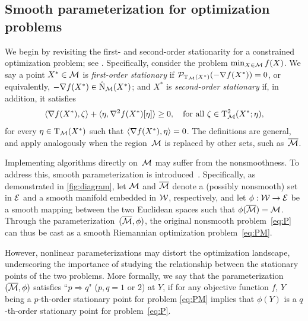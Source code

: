 \subsection{Smooth parameterization for optimization problems}\label{sec:smoothpara_opt}
We begin by revisiting the first- and second-order stationarity for a constrained optimization problem; see \cite{ruszczynski2006nonlinearopt}. Specifically, consider the problem $\min_{X\in\mathcal{M}} f(X)$. We say a point $X^*\in\mathcal{M}$ is \emph{first-order stationary} if $\mathcal{P}_{\mathrm{T}_{\mathcal{M}}(X^*)}(-\nabla f(X^*))=0$, or equivalently, $-\nabla f(X^*)\in\hat{\mathrm{N}}_{\mathcal{M}}(X^*)$; and $X^*$ is \emph{second-order stationary} if, in addition, it satisfies
\begin{equation}\label{eq:def2optcon}
    \langle {\nabla f(X^*),\zeta} \rangle+\langle {\eta,\nabla^2 f(X^*)[\eta]} \rangle \ge 0,\quad\text{for all}\ \zeta\in\mathrm{T}^2_{\mathcal{M}}(X^*;\eta),
\end{equation}
for every $\eta\in\mathrm{T}_{\mathcal{M}}(X^*)$ such that $\langle {\nabla f(X^*),\eta} \rangle=0$. The definitions are general, and apply analogously when the region~$\mathcal{M}$ is replaced by other sets, such as~$\overline{\mathcal{M}}$.



Implementing algorithms directly on~$\mathcal{M}$ may suffer from the nonsmoothness. To address this, smooth parameterization is introduced~\cite{levin2023remedy,rebjock2024boundedrank,levin2025effect,yang2025spacedecouple}. Specifically, as demonstrated in \myfig\ref{fig:diagram}, let $\mathcal{M}$ and $\overline{\mathcal{M}}$ denote a (possibly nonsmooth) set in $\mathcal{E}$ and a smooth manifold embedded in $\mathcal{W}$, respectively, and let $\phi:\mathcal{W}\to\mathcal{E}$ be a smooth mapping between the two Euclidean spaces such that $\phi(\overline{\mathcal{M}})=\mathcal{M}$. Through the parameterization~$(\overline{\mathcal{M}},\phi)$, the original nonsmooth problem~\eqref{eq:P} can thus be cast as a smooth Riemannian optimization problem~\eqref{eq:PM}. 

However, nonlinear parameterizations may distort the optimization landscape, underscoring the importance of studying the relationship between the stationary points of the two problems. More formally, we say that the parameterization $(\overline{\mathcal{M}},\phi)$ satisfies ``${p\Rightarrow q}$" ($p,q=1$ or $2$) at $Y$, if for any objective function $f$, $Y$ being a $p$-th-order stationary point for problem \eqref{eq:PM} implies that $\phi(Y)$ is a $q$-th-order stationary point for problem~\eqref{eq:P}.




